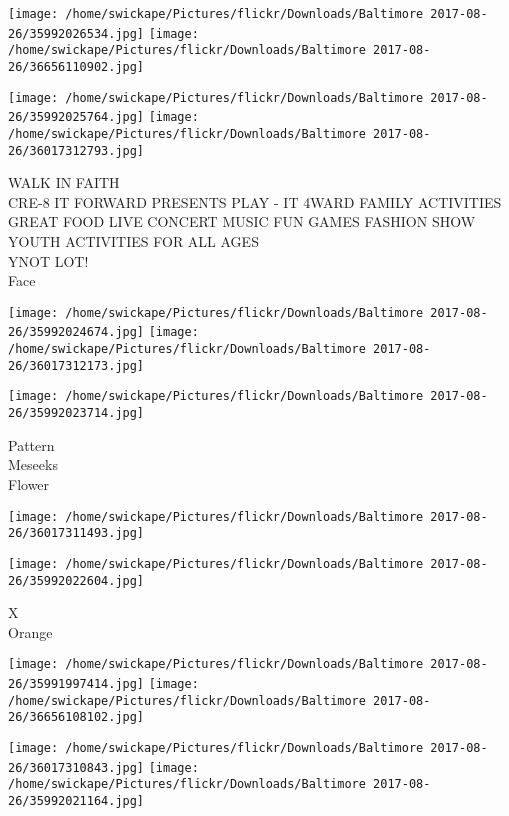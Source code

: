 \documentclass[10pt,letterpaper]{article}
\begin{document}
\texttt{[image: /home/swickape/Pictures/flickr/Downloads/Baltimore 2017-08-26/35992026534.jpg]}
\texttt{[image: /home/swickape/Pictures/flickr/Downloads/Baltimore 2017-08-26/36656110902.jpg]}

\texttt{[image: /home/swickape/Pictures/flickr/Downloads/Baltimore 2017-08-26/35992025764.jpg]}
\texttt{[image: /home/swickape/Pictures/flickr/Downloads/Baltimore 2017-08-26/36017312793.jpg]}

WALK IN FAITH\\
CRE{-}8 IT FORWARD PRESENTS PLAY {-} IT 4WARD FAMILY ACTIVITIES GREAT FOOD LIVE CONCERT MUSIC FUN GAMES FASHION SHOW YOUTH ACTIVITIES FOR ALL AGES\\
YNOT LOT!\\
Face\\
\pagebreak

\texttt{[image: /home/swickape/Pictures/flickr/Downloads/Baltimore 2017-08-26/35992024674.jpg]}
\texttt{[image: /home/swickape/Pictures/flickr/Downloads/Baltimore 2017-08-26/36017312173.jpg]}

\vspace{0.25in}
\texttt{[image: /home/swickape/Pictures/flickr/Downloads/Baltimore 2017-08-26/35992023714.jpg]}

Pattern\\
Meseeks\\
Flower\\
\pagebreak

\texttt{[image: /home/swickape/Pictures/flickr/Downloads/Baltimore 2017-08-26/36017311493.jpg]}

\vspace{0.25in}
\texttt{[image: /home/swickape/Pictures/flickr/Downloads/Baltimore 2017-08-26/35992022604.jpg]}

X\\
Orange\\
\pagebreak

\texttt{[image: /home/swickape/Pictures/flickr/Downloads/Baltimore 2017-08-26/35991997414.jpg]}
\texttt{[image: /home/swickape/Pictures/flickr/Downloads/Baltimore 2017-08-26/36656108102.jpg]}

\texttt{[image: /home/swickape/Pictures/flickr/Downloads/Baltimore 2017-08-26/36017310843.jpg]}
\texttt{[image: /home/swickape/Pictures/flickr/Downloads/Baltimore 2017-08-26/35992021164.jpg]}
\end{document}
